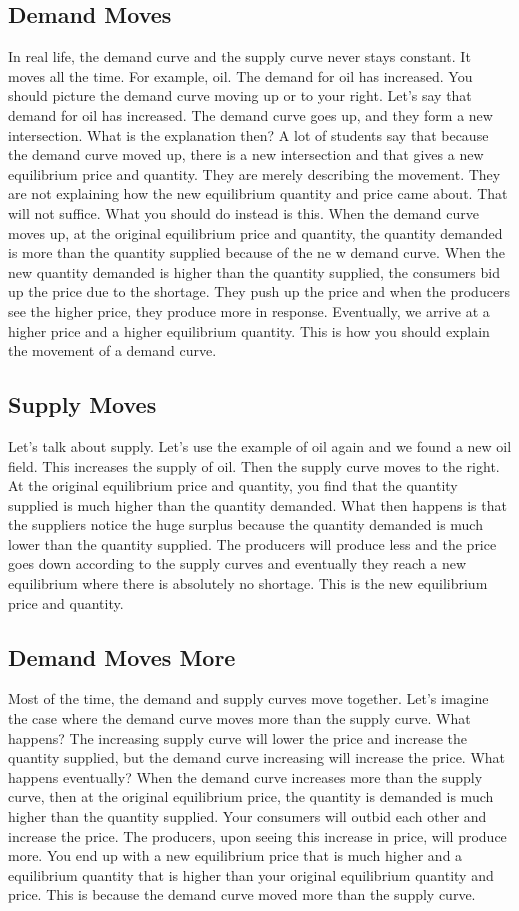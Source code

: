 \documentclass[DIV=calc,11pt,parskip,numbers=noenddot]{scrartcl} %
\begin{document}
\subsection{Demand Moves}
In real life, the demand curve and the supply curve never stays constant. It moves all the time. For example, oil. The demand for oil has increased. You should picture the demand curve moving up or to your right. Let's say that demand for oil has increased. The demand curve goes up, and they form a new intersection. What is the explanation then? A lot of students say that because the demand curve moved up, there is a new intersection and that gives a new equilibrium price and quantity. They are merely describing the movement. They are not explaining how the new equilibrium quantity and price came about. That will not suffice. What you should do instead is this. When the demand curve moves up, at the original equilibrium price and quantity, the quantity demanded is more than the quantity supplied because of the ne w demand curve. When the new quantity demanded is higher than the quantity supplied, the consumers bid up the price due to the shortage. They push up the price and when the producers see the higher price, they produce more in response. Eventually, we arrive at a higher price and a higher equilibrium quantity. This is how you should explain the movement of a demand curve.
\subsection{Supply Moves}
Let's talk about supply. Let's use the example of oil again and we found a new oil field. This increases the supply of oil. Then the supply curve moves to the right. At the original equilibrium price and quantity, you find that the quantity supplied is much higher than the quantity demanded. What then happens is that the suppliers notice the huge surplus because the quantity demanded is much lower than the quantity supplied. The producers will produce less and the price goes down according to the supply curves and eventually they reach a new equilibrium where there is absolutely no shortage. This is the new equilibrium price and quantity.
\subsection{Demand Moves More}
Most of the time, the demand and supply curves move together. Let's imagine the case where the demand curve moves more than the supply curve. What happens? The increasing supply curve will lower the price and increase the quantity supplied, but the demand curve increasing will increase the price. What happens eventually? When the demand curve increases more than the supply curve, then at the original equilibrium price, the quantity is demanded is much higher than the quantity supplied. Your consumers will outbid each other and increase the price. The producers, upon seeing this increase in price, will produce more. You end up with a new equilibrium price that is much higher and a equilibrium quantity that is higher than your original equilibrium quantity and price. This is because the demand curve moved more than the supply curve.
\end{document}
